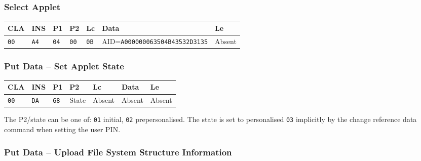 \documentclass{article}
\begin{document}
\subsubsection{Select Applet}

\begin{flushleft}
\begin{tabular}{|l|l|l|l|l|l|l|}
\hline
CLA & INS & P1 & P2 & Lc & Data & Le \\
\hline
\texttt{00} & \texttt{A4} & \texttt{04} & \texttt{00} &
\texttt{0B} & AID=\texttt{A000000063504B43532D3135} & Absent \\
\hline
\end{tabular}
\end{flushleft}


\subsubsection{Put Data -- Set Applet State}

\begin{flushleft}
\begin{tabular}{|l|l|l|l|l|l|l|}
\hline
CLA & INS & P1 & P2 & Lc & Data & Le \\
\hline
\texttt{00} & \texttt{DA} & \texttt{68} & State &
Absent & Absent & Absent \\
\hline
\end{tabular}
\end{flushleft}
The P2/state can be one of: \texttt{01} initial, \texttt{02} prepersonalised. The state is set to
personalised \texttt{03} implicitly by the change reference data command when setting the user PIN.

\subsubsection{Put Data -- Upload File System Structure Information}
\end{document}
